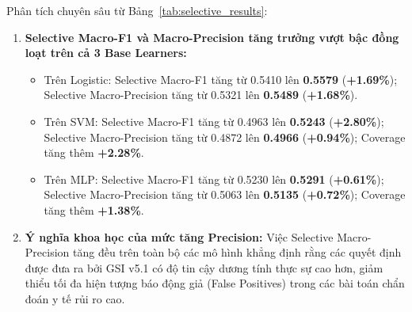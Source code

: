 \documentclass[11pt,a4paper]{article}
\begin{document}
\begin{table}[htbp]
\centering
\caption{Hiệu năng dự đoán chọn lọc tại chi phí từ chối $c = 0.30$ trung bình trên 10 bộ dữ liệu.}
\label{tab:selective_results}
\small
{}
\end{table}

\noindent Phân tích chuyên sâu từ Bảng~\ref{tab:selective_results}:
\begin{enumerate}
    \item \textbf{Selective Macro-F1 và Macro-Precision tăng trưởng vượt bậc đồng loạt trên cả 3 Base Learners:} 
    \begin{itemize}
        \item Trên Logistic: Selective Macro-F1 tăng từ 0.5410 lên \textbf{0.5579} (\textbf{+1.69\%}); Selective Macro-Precision tăng từ 0.5321 lên \textbf{0.5489} (\textbf{+1.68\%}).
        \item Trên SVM: Selective Macro-F1 tăng từ 0.4963 lên \textbf{0.5243} (\textbf{+2.80\%}); Selective Macro-Precision tăng từ 0.4872 lên \textbf{0.4966} (\textbf{+0.94\%}); Coverage tăng thêm \textbf{+2.28\%}.
        \item Trên MLP: Selective Macro-F1 tăng từ 0.5230 lên \textbf{0.5291} (\textbf{+0.61\%}); Selective Macro-Precision tăng từ 0.5063 lên \textbf{0.5135} (\textbf{+0.72\%}); Coverage tăng thêm \textbf{+1.38\%}.
    \end{itemize}
    \item \textbf{Ý nghĩa khoa học của mức tăng Precision:} Việc Selective Macro-Precision tăng đều trên toàn bộ các mô hình khẳng định rằng các quyết định được đưa ra bởi GSI v5.1 có độ tin cậy dương tính thực sự cao hơn, giảm thiểu tối đa hiện tượng báo động giả (False Positives) trong các bài toán chẩn đoán y tế rủi ro cao.
\end{enumerate}
\end{document}
